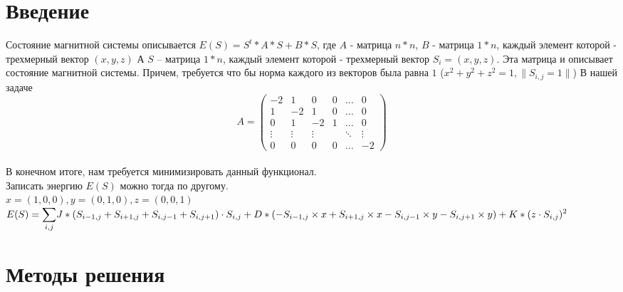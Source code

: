 \documentclass[ 12pt,x11names]{article}
\begin{document}
    \section{Введение}
    Состояние магнитной системы описывается
    $E(S) = S^t*A*S + B*S$, где $A$ - матрица $n * n$, $B$ - матрица $1 * n$,
    каждый элемент которой - трехмерный вектор $(x, y, z)$
    А $S$ -- матрица $1*n$, каждый элемент которой - трехмерный вектор $S_i = (x, y, z)$. Эта матрица и описывает состояние магнитной системы.
    Причем, требуется что бы норма каждого из векторов была равна $1$
    ($x^2 + y ^ 2 + z ^ 2 = 1, \|S_{i, j} = 1\|$)
    В нашей задаче
    \begin{equation*}
    A = \left(
    \begin{array}{ccccс}
    -2 & 1 & 0 & 0 & \ldots & 0\\
    1 & -2 & 1 & 0 &\ldots & 0\\
    0 & 1 & -2 & 1 &\ldots & 0\\
    \vdots &\vdots &\vdots &  &\ddots & \vdots\\
    0 & 0 &  0&   0 &\ldots & -2
    \end{array}
    \right)
    \end{equation*}\\
    В конечном итоге, нам требуется минимизировать данный функционал.\\
    Записать энергию $E(S)$ можно тогда по другому.\\
    $x = (1,0, 0), y = (0,1, 0), z =(0, 0 , 1)$\\
    $E(S) = \displaystyle{\sum_{i, j}} J* (S_{i - 1, j} + S_{i + 1, j} + S_{i, j - 1} + S_{i, j + 1}) \cdot S_{i,j} + \\
    D * (-S_{i - 1, j} \times x  + S_{i + 1, j} \times x - S_{i, j - 1} \times y - S_{i, j + 1} \times y)
    + \\
    K * (z \cdot S_{i,j}) ^ 2$\\
    \section{Методы решения}
\end{document}
